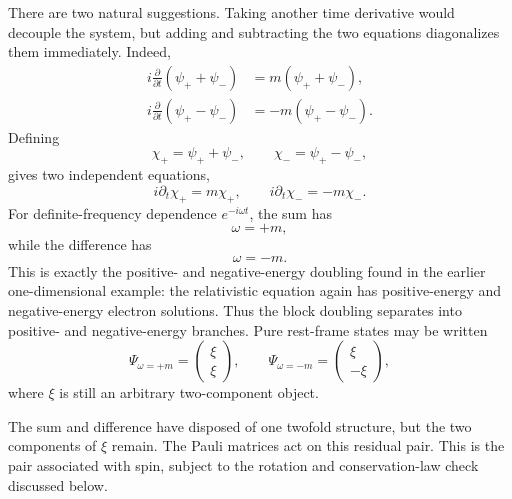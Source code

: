 There are two natural suggestions. Taking another time derivative would decouple the system, but adding and subtracting the two equations diagonalizes them immediately. Indeed,
\begin{align}
i\frac{\partial}{\partial t}(\psi_++\psi_-)
&=m(\psi_++\psi_-),\\
i\frac{\partial}{\partial t}(\psi_+-\psi_-)
&=-m(\psi_+-\psi_-).
\end{align}
Defining
\begin{equation}
\chi_+=\psi_++\psi_-,
\qquad
\chi_-=\psi_+-\psi_-,
\end{equation}
gives two independent equations,
\begin{equation}
i\partial_t\chi_+=m\chi_+,
\qquad
i\partial_t\chi_-=-m\chi_-.
\end{equation}
For definite-frequency dependence \(e^{-i\omega t}\), the sum has
\begin{equation}
\omega=+m,
\end{equation}
while the difference has
\begin{equation}
\omega=-m.
\end{equation}
This is exactly the positive- and negative-energy doubling found in the earlier one-dimensional example: the relativistic equation again has positive-energy and negative-energy electron solutions. Thus the block doubling separates into positive- and negative-energy branches. Pure rest-frame states may be written
\begin{equation}
\Psi_{\omega=+m}=
\begin{pmatrix}
\xi\\
\xi
\end{pmatrix},
\qquad
\Psi_{\omega=-m}=
\begin{pmatrix}
\xi\\
-\xi
\end{pmatrix},
\end{equation}
where \(\xi\) is still an arbitrary two-component object.

The sum and difference have disposed of one twofold structure, but the two components of \(\xi\) remain. The Pauli matrices act on this residual pair. This is the pair associated with spin, subject to the rotation and conservation-law check discussed below.

\begin{classroomqa}
\end{classroomqa}

